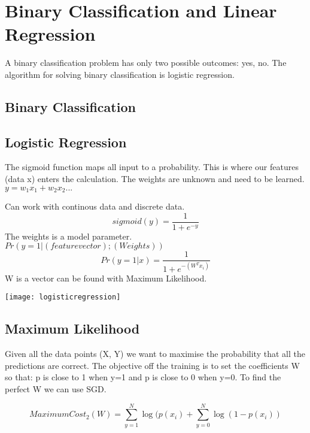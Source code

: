 \section{Binary Classification and Linear Regression}
A binary classification problem has only two possible outcomes: yes, no. The algorithm for solving binary classification is logistic regression.

\subsection{Binary Classification}




\subsection{Logistic Regression}
 The sigmoid function maps all input to a probability. This is where our features (data x) enters the calculation. The weights are unknown and need to be learned. 
$y=w_{1} x_{1}+w_{2} x_{2}...$

\begin{minipage}{0,6\linewidth}
	Can work with continous data and discrete data.
	\[ sigmoid(y) = \frac{1}{1+ e^{-y}} \] 
	The weights is a model parameter. \\
	$Pr(y=1|(feature vector); (Weights))$\\
	\[ Pr(y=1|x) = \frac{1}{1+e^{-(W^{T} x_{i})}} \] 	
	W is a vector can be found with Maximum Likelihood. 
\end{minipage}
\begin{minipage}{0,4\linewidth}
	\texttt{[image: logisticregression]}
\end{minipage}

\subsection{Maximum Likelihood}
Given all the data points (X, Y) we want to maximise the probability that all the predictions are correct.  The objective off the training is to set the coefficients W so that: p is close to 1 when y=1 and p is close to 0 when y=0. To find the perfect W we can use SGD.

\[ Maximum Cost_{2}(W) = \sum_{y=1}^{N} \log(p(x_{i}) + \sum_{y=0}^{N} \log(1-p(x_{i})) \]



